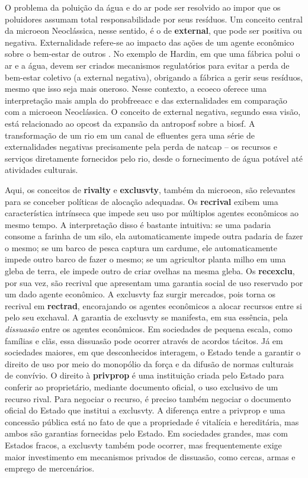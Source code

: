 \documentclass[./main.tex]{subfiles}
\begin{document}
\noindent O problema da poluição da água e do ar pode ser resolvido ao impor que os poluidores assumam total responsabilidade por seus resíduos. Um conceito central da \gls{microeon} Neoclássica, nesse sentido, é o de \textbf{\gls{external}}, que pode ser positiva ou negativa. Externalidade refere-se ao impacto das ações de um agente econômico sobre o bem-estar de outros \cite{Mankiw2002a}. No exemplo de Hardin, em que uma fábrica polui o ar e a água, devem ser criados mecanismos regulatórios para evitar a perda de bem-estar coletivo (a \gls{external} negativa), obrigando a fábrica a gerir seus resíduos, mesmo que isso seja mais oneroso. Nesse contexto, a \gls{ecoeco} oferece uma interpretação mais ampla do \gls{probfreeacc} e das externalidades em comparação com a \gls{microeon} Neoclássica. O conceito de \gls{external} negativa, segundo essa visão, está relacionado ao \gls{opcost} da expansão da \gls{antroposf} sobre a \gls{biosf}. A transformação de um rio em um canal de efluentes gera uma série de externalidades negativas precisamente pela perda de \gls{natcap} -- os recursos e serviços diretamente fornecidos pelo rio, desde o fornecimento de água potável até atividades culturais. 

\par Aqui, os conceitos de \textbf{\gls{rivalty}} e \textbf{\gls{exclusvty}}, também da \gls{microeon}, são relevantes para se conceber políticas de alocação adequadas. Os \textbf{\gls{recrival}} exibem uma característica intrínseca que impede seu uso por múltiplos agentes econômicos ao mesmo tempo. A interpretação disso é bastante intuitiva: se uma padaria consome a farinha de um silo, ela automaticamente impede outra padaria de fazer o mesmo; se um barco de pesca captura um cardume, ele automaticamente impede outro barco de fazer o mesmo; se um agricultor planta milho em uma gleba de terra, ele impede outro de criar ovelhas na mesma gleba. Os \textbf{\gls{recexclu}}, por sua vez, são \gls{recrival} que apresentam uma garantia social de uso reservado por um dado agente econômico. A \gls{exclusvty} faz surgir mercados, pois torna os \gls{recrival} em \textbf{\gls{rectrad}}, encorajando os agentes econômicos a alocar recursos entre si pelo seu \gls{exchaval}. A garantia de \gls{exclusvty} se manifesta, em sua essência, pela \textit{dissuasão} entre os agentes econômicos. Em sociedades de pequena escala, como famílias e clãs, essa dissuasão pode ocorrer através de acordos tácitos. Já em sociedades maiores, em que desconhecidos interagem, o Estado tende a garantir o direito de uso por meio do monopólio da força e da difusão de normas culturais de convívio. O direito à \textbf{\gls{privprop}} é uma instituição criada pelo Estado para conferir ao proprietário, mediante documento oficial, o uso exclusivo de um recurso rival. Para negociar o recurso, é preciso também negociar o documento oficial do Estado que institui a \gls{exclusvty}. A diferença entre a \gls{privprop} e uma concessão pública está no fato de que a propriedade é vitalícia e hereditária, mas ambos são garantias fornecidas pelo Estado. Em sociedades grandes, mas com Estados fracos, a \gls{exclusvty} também pode ocorrer, mas frequentemente exige maior investimento em mecanismos privados de dissuasão, como cercas, armas e emprego de mercenários.
\end{document}
